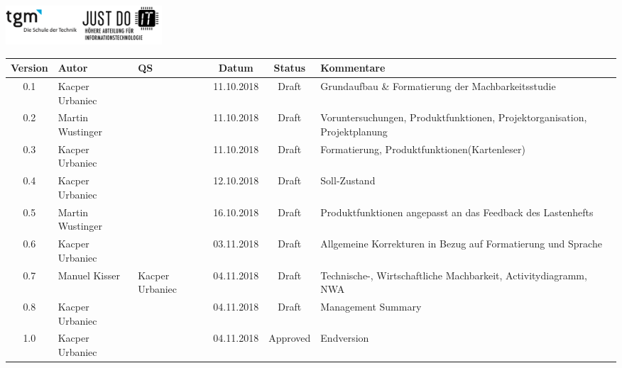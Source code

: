 \documentclass[minted, notitle]{protocol}
\newcommand{\draft}{\cellcolor{Peach} Draft}
\newcommand{\abgabe}{\cellcolor{LimeGreen}Approved }
\begin{document}
\begin{titlepage}
{		%
		{\vspace{0.3cm}\includegraphics[width=220]{images/tgm_full.png}}
	}
\end{titlepage}


\begin{center}

\begin{tabular}{| c | p{1.8cm} | p{1.8cm} | c | c | p{3.4cm} |}
\hline \rowcolor{gray} \textbf{\color{white}Version} & \textbf{\color{white}Autor} & \textbf{\color{white}QS} & \textbf{\color{white}Datum} & \textbf{\color{white}Status} & \textbf{\color{white}Kommentare} \\ 
 \hline \hline
 0.1 & Kacper Urbaniec && 11.10.2018 & \draft & Grundaufbau \& Formatierung der Machbarkeitsstudie\\
 \hline  
 0.2 & Martin Wustinger && 11.10.2018 & \draft & Voruntersuchungen, Produktfunktionen, Projektorganisation, Projektplanung\\
 \hline  
  0.3 & Kacper Urbaniec && 11.10.2018 & \draft & Formatierung, Produktfunktionen(Kartenleser)\\
 \hline  
  0.4 & Kacper Urbaniec && 12.10.2018 & \draft & Soll-Zustand\\
 \hline  
  0.5 & Martin Wustinger && 16.10.2018 & \draft & Produktfunktionen angepasst an das Feedback des Lastenhefts\\
 \hline  
 0.6 & Kacper Urbaniec && 03.11.2018 & \draft & Allgemeine Korrekturen in Bezug auf Formatierung und Sprache\\
 \hline
 0.7 & Manuel Kisser &  Kacper Urbaniec& 04.11.2018 & \draft & Technische-, Wirtschaftliche Machbarkeit, Activitydiagramm, NWA\\
 \hline  
 0.8 & Kacper Urbaniec && 04.11.2018 & \draft & Management Summary\\
 \hline
 1.0 & Kacper Urbaniec &&04.11.2018& \abgabe &Endversion\\
 \hline
\end{tabular}
\end{center}

\clearpage
{ %
  \hypersetup{linkcolor=black}
  {\small\tableofcontents}
} 
\clearpage

\end{document}
